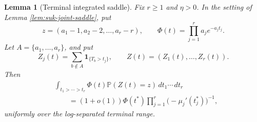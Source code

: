 \documentclass[11pt]{article}
\newtheorem{lemma}[theorem]{Lemma}
\theoremstyle{remark}
\newcommand{\Pp}{\mathbb P}
\newcommand{\one}{\mathbf 1}
\newcommand{\dd}{\,d}
\begin{document}
\begin{lemma}[Terminal integrated saddle]\label{lem:terminal-integrated-saddle}
Fix \(r\ge1\) and \(\eta>0\).  In the setting of Lemma \ref{lem:suk-joint-saddle}, put
\[
        z=(a_1-1,a_2-2,\ldots,a_r-r),
        \qquad
        \Phi(t)=\prod_{j=1}^r a_j e^{-a_jt_j}.
\]
Let \(A=\{a_1,\ldots,a_r\}\), and put
\[
        Z_j(t)=\sum_{b\notin A}\one_{\{T_b>t_j\}},
        \qquad Z(t)=(Z_1(t),\ldots,Z_r(t)).
\]
Then
\[
\begin{aligned}
&\int_{t_1>\cdots>t_r}
        \Phi(t)\Pp(Z(t)=z)\dd t_1\cdots\dd t_r  \\
&\qquad =
        (1+o(1))\Phi(t^*)
        \prod_{j=1}^r\bigl(-\mu_j'(t_j^*)\bigr)^{-1},
\end{aligned}
\]
uniformly over the log-separated terminal range.
\end{lemma}
\end{document}
